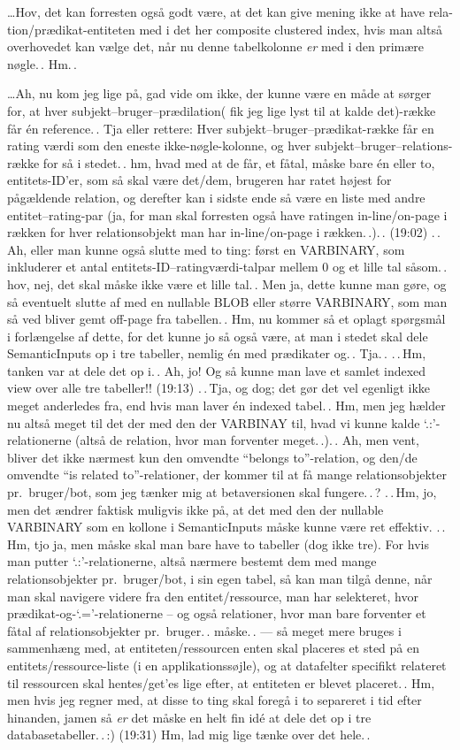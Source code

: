 \documentclass{report}
\begin{document}
\ldots Hov, det kan forresten også godt være, at det kan give mening ikke at have rela-tion/prædikat-entiteten med i det her composite clustered index, hvis man altså overhovedet kan vælge det, når nu denne tabelkolonne \emph{er} med i den primære nøgle.\,. Hm.\,. 

\ldots Ah, nu kom jeg lige på, gad vide om ikke, der kunne være en måde at sørger for, at hver subjekt--bruger--prædilation( fik jeg lige lyst til at kalde det)-række får én reference.\,. Tja eller rettere: Hver subjekt--bruger--prædikat-række får en rating værdi som den eneste ikke-nøgle-kolonne, og hver subjekt--bruger--relations-række for så i stedet.\,. hm, hvad med at de får, et fåtal, måske bare én eller to, entitets-ID'er, som så skal være det/dem, brugeren har ratet højest for pågældende relation, og derefter kan i sidste ende så være en liste med andre entitet--rating-par (ja, for man skal forresten også have ratingen in-line/on-page i rækken for hver relationsobjekt man har in-line/on-page i rækken.\,.).\,. (19:02) .\,.\,Ah, eller man kunne også slutte med to ting: først en VARBINARY, som inkluderer et antal entitets-ID--ratingværdi-talpar mellem 0 og et lille tal såsom.\,. hov, nej, det skal måske ikke være et lille tal.\,. Men ja, dette kunne man gøre, og så eventuelt slutte af med en nullable BLOB eller større VARBINARY, som man så ved bliver gemt off-page fra tabellen.\,. Hm, nu kommer så et oplagt spørgsmål i forlængelse af dette, for det kunne jo så også være, at man i stedet skal dele SemanticInputs op i tre tabeller, nemlig én med prædikater og.\,. Tja.\,. .\,.\,Hm, tanken var at dele det op i.\,. Ah, jo! Og så kunne man lave et samlet indexed view over alle tre tabeller!! (19:13) .\,.\,Tja, og dog; det gør det vel egenligt ikke meget anderledes fra, end hvis man laver én indexed tabel.\,. Hm, men jeg hælder nu altså meget til det der med den der VARBINAY til, hvad vi kunne kalde `.:'-relationerne (altså de relation, hvor man forventer meget.\,.).\,. Ah, men vent, bliver det ikke nærmest kun den omvendte ``belongs to''-relation, og den/de omvendte ``is related to''-relationer, der kommer til at få mange relationsobjekter pr.\ bruger/bot, som jeg tænker mig at betaversionen skal fungere.\,.\,? .\,.\,Hm, jo, men det ændrer faktisk muligvis ikke på, at det med den der nullable VARBINARY som en kollone i SemanticInputs måske kunne være ret effektiv. .\,.\,Hm, tjo ja, men måske skal man bare have to tabeller (dog ikke tre). For hvis man putter `.:'-relationerne, altså nærmere bestemt dem med mange relationsobjekter pr.\ bruger/bot, i sin egen tabel, så kan man tilgå denne, når man skal navigere videre fra den entitet/ressource, man har selekteret, hvor prædikat-og-`.='-relationerne -- og også relationer, hvor man bare forventer et fåtal af relationsobjekter pr.\ bruger.\,. måske.\,. --- så meget mere bruges i sammenhæng med, at entiteten/ressourcen enten skal placeres et sted på en entitets/ressource-liste (i en applikationssøjle), og at datafelter specifikt relateret til ressourcen skal hentes/get'es lige efter, at entiteten er blevet placeret.\,. Hm, men hvis jeg regner med, at disse to ting skal foregå i to separeret i tid efter hinanden, jamen så \emph{er} det måske en helt fin idé at dele det op i tre databasetabeller.\,.\,:) (19:31) Hm, lad mig lige tænke over det hele.\,. 
\end{document}

